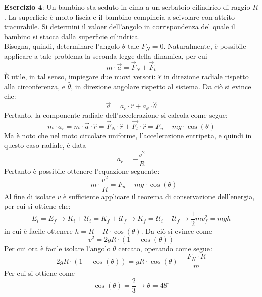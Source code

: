 \documentclass[a4paper]{extarticle}
\begin{document}
\vspace{1em}
\noindent
\textbf{Esercizio $\boldsymbol{4}$}: Un bambino sta seduto in cima a un serbatoio cilindrico di raggio $R$. La superficie è molto liscia e il bambino compincia a scivolare con attrito tracurabile. Si determini il valoer dell'angolo in corrispondenza del quale il bambino si stacca dalla superficie cilindrica.\\
Bisogna, quindi, determinare l'angolo $\theta$ tale $F_N=0$. Naturalmente, è possibile applicare a tale problema la seconda legge della dinamica, per cui
\[m \cdot \vec a = \vec F_N + \vec F_t\]
È utile, in tal senso, impiegare due nuovi versori: $\hat r$ in direzione radiale rispetto alla circonferenza, e $\hat \theta$, in direzione angolare rispetto al sistema. Da ciò si evince che:
\[\vec a = a_r \cdot \hat{r} + a_\theta \cdot \hat{\theta}\]
Pertanto, la componente radiale dell'accelerazione si calcola come segue:
\[m \cdot a_r = m \cdot \vec a \cdot \hat{r} = \vec F_N \cdot \hat{r} + \vec{F_t} \cdot \hat{r} = F_n - mg \cdot \cos(\theta)\]
Ma è noto che nel moto circolare uniforme, l'accelerazione entripeta, e quindi in questo caso radiale, è data
\[a_r = - \frac{v^2}{R}\]
Pertanto è possibile ottenere l'equazione seguente:
\[-m \cdot \frac{v^2}{R} = F_n - mg \cdot \cos(\theta)\]
Al fine di isolare $v$ è sufficiente applicare il teorema di conservazione dell'energia, per cui si ottiene che:
\[E_i = E_f \longrightarrow K_i + \mathcal{U}_{i} = K_f + \mathcal{U}_f \longrightarrow K_f = \mathcal{U}_i - \mathcal{U}_f \longrightarrow \frac{1}{2}mv_f^2 = mgh\]
in cui è facile ottenere $h=R-R \cdot \cos(\theta)$. Da ciò si evince come
\[v^2 = 2g R \cdot (1-\cos(\theta))\]
Per cui ora è facile isolare l'angolo $\theta$ cercato, operando come segue:
\[2g R \cdot (1-\cos(\theta))=gR \cdot \cos(\theta) - \frac{F_N \cdot R}{m}\]
Per cui si ottiene come
\[\cos(\theta) = \frac{2}{3} \longrightarrow \theta=48^\circ\]
\end{document}
